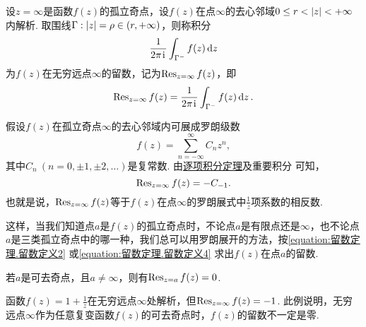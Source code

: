 \begin{definition}
设\(z=\infty\)是函数\(f(z)\)的孤立奇点，设\(f(z)\)在点\(\infty\)的去心邻域\(0 \leq r < \abs{z} < +\infty\)内解析.
取围线\(\Gamma: \abs{z} = \rho\in(r,+\infty)\)，则称积分\[
\frac{1}{2\pi\kern1pt\mathrm{i}\kern1pt} \int_{\Gamma^-} f(z) \dd{z}
\]为\(f(z)\)在无穷远点\(\infty\)的留数，记为\(\operatorname{Res}_{z=\infty} f(z)\)，即\begin{equation}\label{equation:留数定理.留数定义3}
\operatorname{Res}_{z=\infty} f(z)
= \frac{1}{2\pi\kern1pt\mathrm{i}\kern1pt} \int_{\Gamma^-} f(z) \dd{z}.
\end{equation}
\end{definition}
假设\(f(z)\)在孤立奇点\(\infty\)的去心邻域内可展成罗朗级数\[
f(z) = \sum_{n=-\infty}^\infty C_n z^n,
\]其中\(C_n\ (n=0,\pm1,\pm2,\dotsc)\)是复常数.
由\hyperref[theorem:解析函数的级数表示.一致收敛级数的基本性质2]{逐项积分定理}及重要积分  可知，\begin{equation}\label{equation:留数定理.留数定义4}
\operatorname{Res}_{z=\infty} f(z) = - C_{-1}.
\end{equation}
也就是说，\(\operatorname{Res}_{z=\infty} f(z)\)等于\(f(z)\)在点\(\infty\)的罗朗展式中\(\frac{1}{z}\)项系数的相反数.

这样，当我们知道点\(a\)是\(f(z)\)的孤立奇点时，不论点\(a\)是有限点还是\(\infty\)，也不论点\(a\)是三类孤立奇点中的哪一种，我们总可以用罗朗展开的方法，按\cref{equation:留数定理.留数定义2} 或\cref{equation:留数定理.留数定义4} 求出\(f(z)\)在点\(a\)的留数.

\begin{property}
若\(a\)是可去奇点，且\(a\neq\infty\)，则有\(\operatorname{Res}_{z=a} f(z) = 0\).
\end{property}

\begin{example}
函数\(f(z) = 1 + \frac{1}{z}\)在无穷远点\(\infty\)处解析，但\(\operatorname{Res}_{z=\infty} f(z) = -1\).
此例说明，无穷远点\(\infty\)作为任意复变函数\(f(z)\)的可去奇点时，\(f(z)\)的留数不一定是零.
\end{example}

